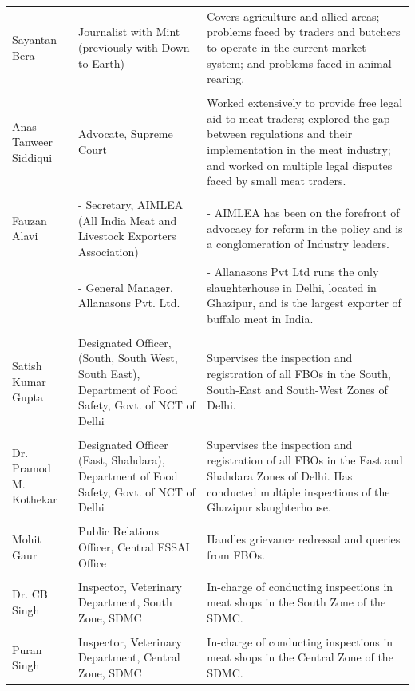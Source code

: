 \documentclass[a4paper, 12pt, twoside]{article}
\begin{document}
\begin{longtable}[l]{>{\raggedright}p{2cm}>{\raggedright}p{5cm}>{\raggedright\arraybackslash}p{7.5cm}}
    Sayantan Bera & Journalist with Mint (previously with Down to Earth) & Covers agriculture and allied areas; problems faced by traders and butchers to operate in the current market system; and problems faced in animal rearing. \\
& & \\
    Anas Tanweer Siddiqui & Advocate, Supreme Court  & Worked extensively to provide free legal aid to meat traders; explored the gap between regulations and their implementation in the meat industry; and worked on multiple legal disputes faced by small meat traders. \\
& & \\
    Fauzan Alavi & - Secretary, AIMLEA (All India Meat and Livestock Exporters Association) & - AIMLEA has been on the forefront of advocacy for reform in the policy and is a conglomeration of Industry leaders. \\
    \multicolumn{1}{r}{} & - General Manager, Allanasons Pvt. Ltd. & - Allanasons Pvt Ltd runs the only slaughterhouse in Delhi, located in Ghazipur, and is the largest exporter of buffalo meat in India. \\
& & \\
    Satish Kumar Gupta & Designated Officer, (South, South West, South East), Department of Food Safety, Govt. of NCT of Delhi & Supervises the inspection and registration of all FBOs in the South, South-East and South-West Zones of Delhi. \\
& & \\
    Dr. Pramod M. Kothekar & Designated Officer (East, Shahdara), Department of Food Safety, Govt. of NCT of Delhi & Supervises the inspection and registration of all FBOs in the East and Shahdara Zones of Delhi. Has conducted multiple inspections of the Ghazipur slaughterhouse. \\
& & \\
    Mohit Gaur & Public Relations Officer, Central FSSAI Office & Handles grievance redressal and queries from FBOs.  \\
   & & \\
    Dr. CB Singh & Inspector, Veterinary Department, South Zone, SDMC & In-charge of conducting inspections in meat shops in the South Zone of the SDMC. \\
& & \\
    Puran Singh & Inspector, Veterinary Department, Central Zone, SDMC & In-charge of conducting inspections in meat shops in the Central Zone of the SDMC. \\
\hline
    \end{longtable}%
\end{document}
